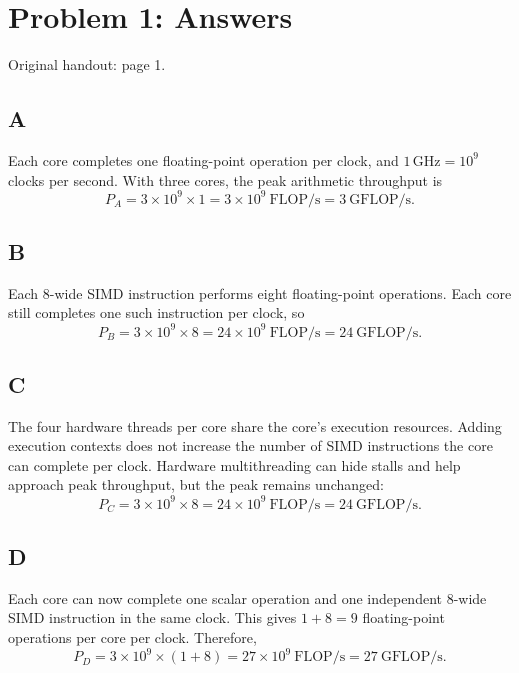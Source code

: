 \documentclass[letterpaper,12pt]{article}
\newcommand{\handout}[1]{%
  
}
\newenvironment{answer}{\par}{\par\medskip}
\begin{document}
\handout{1}
\section*{Problem 1: Answers}
\noindent Original handout: page 1.\par

\subsection*{A}
\begin{answer}
Each core completes one floating-point operation per clock, and
$1\,\mathrm{GHz}=10^9$ clocks per second. With three cores, the peak
arithmetic throughput is
\[
  P_A = 3 \times 10^9 \times 1
      = \boxed{3\times10^9\ \mathrm{FLOP/s}
      = 3\ \mathrm{GFLOP/s}}.
\]
\end{answer}

\subsection*{B}
\begin{answer}
Each 8-wide SIMD instruction performs eight floating-point operations.
Each core still completes one such instruction per clock, so
\[
  P_B = 3 \times 10^9 \times 8
      = \boxed{24\times10^9\ \mathrm{FLOP/s}
      = 24\ \mathrm{GFLOP/s}}.
\]
\end{answer}

\subsection*{C}
\begin{answer}
The four hardware threads per core share the core's execution resources.
Adding execution contexts does not increase the number of SIMD instructions
the core can complete per clock. Hardware multithreading can hide stalls
and help approach peak throughput, but the peak remains unchanged:
\[
  P_C = 3 \times 10^9 \times 8
      = \boxed{24\times10^9\ \mathrm{FLOP/s}
      = 24\ \mathrm{GFLOP/s}}.
\]
\end{answer}

\subsection*{D}
\begin{answer}
Each core can now complete one scalar operation and one independent
8-wide SIMD instruction in the same clock. This gives $1+8=9$
floating-point operations per core per clock. Therefore,
\[
  P_D = 3 \times 10^9 \times (1+8)
      = \boxed{27\times10^9\ \mathrm{FLOP/s}
      = 27\ \mathrm{GFLOP/s}}.
\]
\end{answer}
\end{document}
